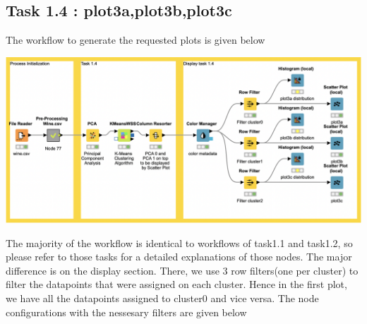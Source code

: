 \documentclass[11pt]{article}
\begin{document}
		 \subsection*{Task 1.4 : plot3a,plot3b,plot3c}
			
			
			The workflow to generate the requested plots is given below
			\iftrue
			\begin{center}
				\includegraphics[scale=0.25]{res/t1/t14/t14-workflow}
			\end{center}
			\fi
			The majority of the workflow is identical to workflows of task1.1 and task1.2, so please refer to those tasks for a detailed explanations of those nodes. The major difference is on the display section. There, we use 3 row filters(one per cluster) to filter the datapoints that were assigned on each cluster. Hence in the first plot, we have all the datapoints assigned to cluster0 and vice versa. The node configurations with the nessesary filters are given below
			\iftrue
\end{document}
